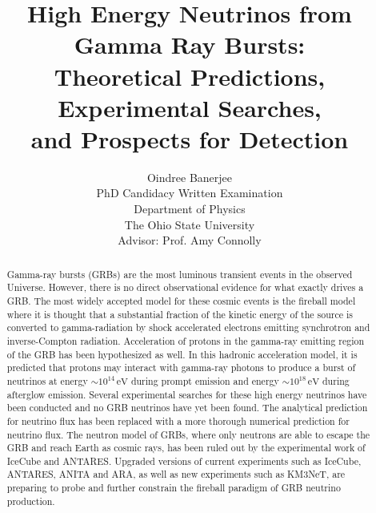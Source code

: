 \documentclass[12pt]{article}
\begin{document}
\title{\textbf{\Large{High Energy Neutrinos from Gamma Ray Bursts:}}\\ {\Large Theoretical Predictions, Experimental Searches, \\ and Prospects for Detection}}

\author{Oindree Banerjee \\
\medskip
PhD Candidacy Written Examination\\
Department of Physics\\
The Ohio State University\\
Advisor: Prof. Amy Connolly}

\maketitle
\begin{abstract}
Gamma-ray bursts (GRBs) are the most luminous transient events in the observed Universe. However, there is no direct observational evidence for what exactly drives a GRB. The most widely accepted model for these cosmic events is the fireball model where it is thought that a substantial fraction of the kinetic energy of the source is converted to gamma-radiation by shock accelerated electrons emitting synchrotron and inverse-Compton radiation. Acceleration of protons in the gamma-ray emitting region of the GRB has been hypothesized as well. In this hadronic acceleration model, it is predicted that protons may interact with gamma-ray photons to produce a burst of neutrinos at energy $\sim 10^{14} \, \mathrm{eV}$ during prompt emission and energy $\sim 10^{18} \, \mathrm{eV}$ during afterglow emission. Several experimental searches for these high energy neutrinos have been conducted and no GRB neutrinos have yet been found. The analytical prediction for neutrino flux has been replaced with a more thorough numerical prediction for neutrino flux. The neutron model of GRBs, where only neutrons are able to escape the GRB and reach Earth as cosmic rays, has been ruled out by the experimental work of IceCube and ANTARES. Upgraded versions of current experiments such as IceCube, ANTARES, ANITA and ARA, as well as new experiments such as KM3NeT, are preparing to probe and further constrain the fireball paradigm of GRB neutrino production. \end{abstract}
\newpage
\tableofcontents
\end{document}
